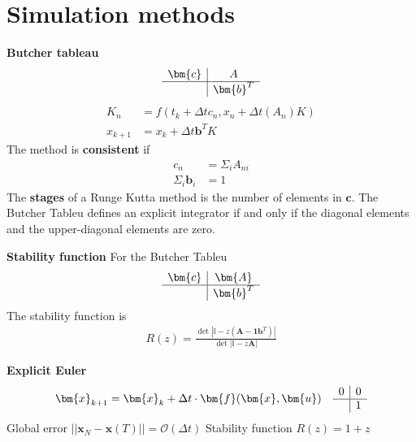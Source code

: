 \section{Simulation methods}

\textbf{Butcher tableau}
\begin{align*}
\begin{array}{c|c}
    \bm{c} & A  \\ \hline
     & \bm{b}^T
\end{array}
\end{align*}
\begin{align*}
    K_n &= f(t_k+\Delta t c_n,x_n + \Delta t (A_n)K) \\
    x_{k+1} &= x_k + \Delta t\bm{b}^TK
\end{align*}
The method is \textbf{consistent} if
\begin{align*}
    c_n &= \Sigma_{i}A_{ni} \\
    \Sigma_i \bm{b}_i &= 1
\end{align*}
The \textbf{stages} of a Runge Kutta method is the number of elements in \(\bm{c}\).
The Butcher Tableu defines an explicit integrator if and only if the diagonal
elements and the upper-diagonal elements are zero.
\newline

\textbf{Stability function}
For the Butcher Tableu
\begin{align*}
\begin{array}{c|c}
    \bm{c} & \bm{A}  \\ \hline
     & \bm{b}^T
\end{array}
\end{align*}
The stability function is
\begin{align*}
    R(z) = \frac{\det|\mathbb{I}-z(\bm{A}-\bm{1}\bm{b}^T)|}{\det|\mathbb{I}-z\bm{A}|}
\end{align*}

\textbf{Explicit Euler}
\begin{align*}
    &\bm{x}_{k+1} = \bm{x}_k + \Delta t \cdot \bm{f}(\bm{x},\bm{u}) 
    &\begin{array}{c|c}
         0 & 0 \\ \hline
          & 1
    \end{array}
\end{align*}
Global error \(||\bm{x}_N-\bm{x}(T)|| = \mathcal{O}(\Delta t)\)
\newline
Stability function \(R(z) = 1+z\)
\newline

